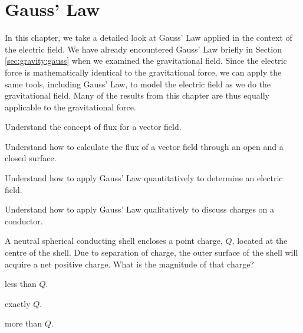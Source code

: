 
\chapter{Gauss' Law}
\label{chapter:gauss}
In this chapter, we take a detailed look at Gauss' Law applied in the context of the electric field. We have already encountered Gauss' Law briefly in Section \ref{sec:gravity:gauss} when we examined the gravitational field. Since the electric force is mathematically identical to the gravitational force, we can apply the same tools, including Gauss' Law, to model the electric field as we do the gravitational field. Many of the results from this chapter are thus equally applicable to the gravitational force. 

\begin{learningObjectives}{
 \item Understand the concept of flux for a vector field.
 \item Understand how to calculate the flux of a vector field through an open and a closed surface.
 \item Understand how to apply Gauss' Law quantitatively to determine an electric field.
 \item Understand how to apply Gauss' Law qualitatively to discuss charges on a conductor.
 }
\end{learningObjectives}

\begin{opening}
\begin{MCquestion}{A neutral spherical conducting shell encloses a point charge, $Q$, located at the centre of the shell. Due to separation of charge, the outer surface of the shell will acquire a net positive charge. What is the magnitude of that charge? }
\item less than $Q$.
\item exactly $Q$. \correct
\item more than $Q$.
\end{MCquestion}
\end{opening}


